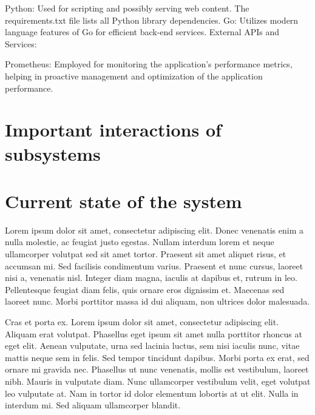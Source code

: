 \documentclass[12pt, a4paper, oneside]{book}
\begin{document}
Python: Used for scripting and possibly serving web content. The requirements.txt file lists all Python library dependencies.
Go: Utilizes modern language features of Go for efficient back-end services.
External APIs and Services:

Prometheus: Employed for monitoring the application’s performance metrics, helping in proactive management and optimization of the application performance.

\section{Important interactions of subsystems}

\section{Current state of the system}


Lorem ipsum dolor sit amet, consectetur adipiscing elit. Donec venenatis enim a nulla molestie, ac feugiat justo egestas. Nullam interdum lorem et neque ullamcorper volutpat sed sit amet tortor. Praesent sit amet aliquet risus, et accumsan mi. Sed facilisis condimentum varius. Praesent et nunc cursus, laoreet nisi a, venenatis nisl. Integer diam magna, iaculis at dapibus et, rutrum in leo. Pellentesque feugiat diam felis, quis ornare eros dignissim et. Maecenas sed laoreet nunc. Morbi porttitor massa id dui aliquam, non ultrices dolor malesuada.

Cras et porta ex. Lorem ipsum dolor sit amet, consectetur adipiscing elit. Aliquam erat volutpat. Phasellus eget ipsum sit amet nulla porttitor rhoncus at eget elit. Aenean vulputate, urna sed lacinia luctus, sem nisi iaculis nunc, vitae mattis neque sem in felis. Sed tempor tincidunt dapibus. Morbi porta ex erat, sed ornare mi gravida nec. Phasellus ut nunc venenatis, mollis est vestibulum, laoreet nibh. Mauris in vulputate diam. Nunc ullamcorper vestibulum velit, eget volutpat leo vulputate at. Nam in tortor id dolor elementum lobortis at ut elit. Nulla in interdum mi. Sed aliquam ullamcorper blandit.
\end{document}
